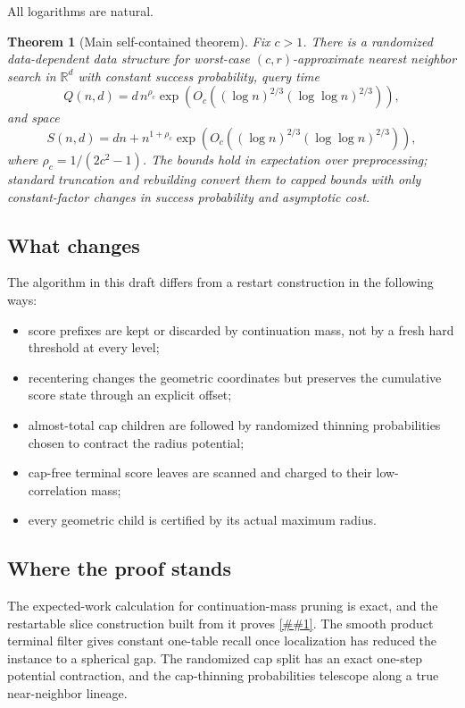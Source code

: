 \documentclass[10pt]{article}
\newcommand{\cref}[1]{\ref{##1}}
\newtheorem{theorem}{Theorem}[section]
\theoremstyle{definition}
\newcommand{\R}{\mathbb{R}}
\begin{document}
All logarithms are natural.

\begin{theorem}[Main self-contained theorem]\label{thm:main}
   Fix $c>1$. There is a randomized data-dependent data structure for worst-case $(c,r)$-approximate nearest neighbor search in $\R^d$ with constant success probability, query time
   \[
      Q(n,d)
      =
      d\,n^{\rho_c}
      \exp\!\left(
         O_c\!\left((\log n)^{2/3}(\log\log n)^{2/3}\right)
      \right),
   \]
   and space
   \[
      S(n,d)
      =
      dn+n^{1+\rho_c}
      \exp\!\left(
         O_c\!\left((\log n)^{2/3}(\log\log n)^{2/3}\right)
      \right),
   \]
   where $\rho_c=1/(2c^2-1)$. The bounds hold in expectation over preprocessing; standard truncation and rebuilding convert them to capped bounds with only constant-factor changes in success probability and asymptotic cost.
\end{theorem}

\subsection{What changes}

The algorithm in this draft differs from a restart construction in the following ways:
\begin{itemize}
   \item score prefixes are kept or discarded by continuation mass, not by a fresh hard threshold at every level;
   \item recentering changes the geometric coordinates but preserves the cumulative score state through an explicit offset;
   \item almost-total cap children are followed by randomized thinning probabilities chosen to contract the radius potential;
   \item cap-free terminal score leaves are scanned and charged to their low-correlation mass;
   \item every geometric child is certified by its actual maximum radius.
\end{itemize}

\subsection{Where the proof stands}

The expected-work calculation for continuation-mass pruning is exact, and the restartable slice construction built from it proves \cref{thm:main}. The smooth product terminal filter gives constant one-table recall once localization has reduced the instance to a spherical gap. The randomized cap split has an exact one-step potential contraction, and the cap-thinning probabilities telescope along a true near-neighbor lineage.
\end{document}
